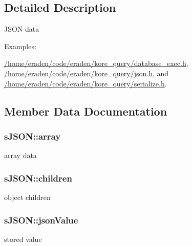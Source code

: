 \subsection{Detailed Description}
J\+S\+ON data \begin{Desc}
\item[Examples\+: ]\par
\hyperlink{_2home_2eraden_2code_2eraden_2kore_query_2database_exec_8h-example}{/home/eraden/code/eraden/kore\+\_\+query/database\+\_\+exec.\+h}, \hyperlink{_2home_2eraden_2code_2eraden_2kore_query_2json_8h-example}{/home/eraden/code/eraden/kore\+\_\+query/json.\+h}, and \hyperlink{_2home_2eraden_2code_2eraden_2kore_query_2serialize_8h-example}{/home/eraden/code/eraden/kore\+\_\+query/serialize.\+h}.\end{Desc}


\subsection{Member Data Documentation}
\subsubsection[{\texorpdfstring{array}{array}}]{ s\+J\+S\+O\+N\+::array}\hypertarget{structsJSON_a0c4e270679b9317e0ad2ad1373f7956e}{}\label{structsJSON_a0c4e270679b9317e0ad2ad1373f7956e}
array data 
\subsubsection[{\texorpdfstring{children}{children}}]{ s\+J\+S\+O\+N\+::children}\hypertarget{structsJSON_ab7bcf99ed5e4560654fe406448ef3dac}{}\label{structsJSON_ab7bcf99ed5e4560654fe406448ef3dac}
object children 
\subsubsection[{\texorpdfstring{json\+Value}{jsonValue}}]{ s\+J\+S\+O\+N\+::json\+Value}\hypertarget{structsJSON_ae4d7953fe5e0369930ba3ddd91d64743}{}\label{structsJSON_ae4d7953fe5e0369930ba3ddd91d64743}
stored value 
